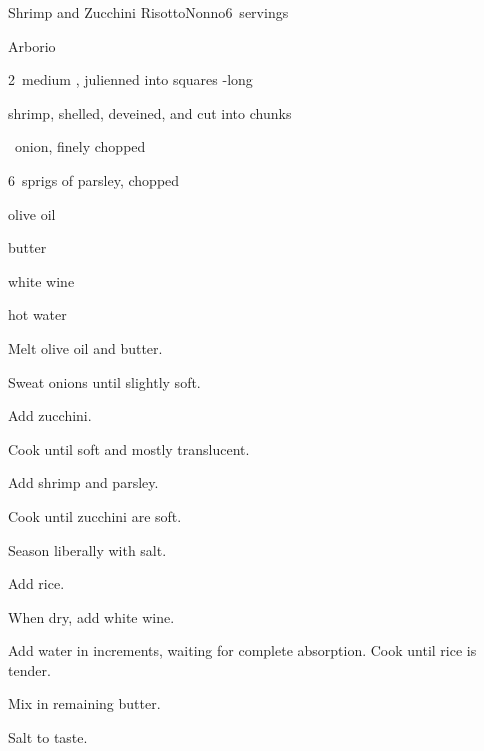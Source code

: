 \begin{recipe}{Shrimp and Zucchini Risotto}{Nonno}{6~servings}

\begin{ingredients}
\item {} Arborio 
\item 2~medium , julienned into \inch{\quarter} squares -long
\item {} shrimp, shelled, deveined, and cut into chunks
\item \half{}~onion, finely chopped
\item 6~sprigs of parsley, chopped
\item {} olive oil
\item {} butter
\item \C{\half} white wine
\item hot water
\end{ingredients}

\begin{directions}
\item Melt olive oil and butter.
\item Sweat onions until slightly soft.
\item Add zucchini.
\item Cook until soft and mostly translucent.
\item Add shrimp and parsley.
\item Cook until zucchini are soft.
\item Season liberally with salt.
\item Add rice.
\item When dry, add white wine.
\item Add water in \C{\half} increments, waiting for complete absorption. Cook until rice is tender.
\item Mix in remaining butter.
\item Salt to taste.
\end{directions}

\end{recipe}
